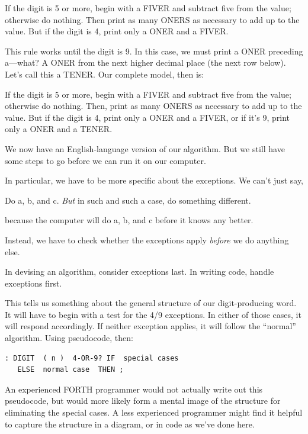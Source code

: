 \begin{tfquot}
If the digit is 5 or more, begin with a FIVER and subtract five from the
value; otherwise do nothing. Then print as many ONERS as necessary to
add up to the value. But if the digit is 4, print only a ONER and a FIVER.
\end{tfquot}
This rule works until the digit is 9. In this case, we must print a ONER
preceding a---what? A ONER from the next higher decimal place (the
next row below). Let's call this a TENER. Our complete model, then is:

\begin{tfquot}
If the digit is 5 or more, begin with a FIVER and subtract five from the
value; otherwise do nothing. Then, print as many ONERS as necessary to
add up to the value. But if the digit is 4, print only a ONER and a FIVER,
or if it's 9, print only a ONER and a TENER.
\end{tfquot}
We now have an English-language version of our algorithm. But we still
have some steps to go before we can run it on our computer.

In particular, we have to be more specific about the exceptions. We
can't just say,

\begin{tfquot}
Do a, b, and c. \emph{But} in such and such a case, do something different.
\end{tfquot}
because the computer will do a, b, and c before it knows any better.

Instead, we have to check whether the exceptions apply \emph{before} we
do anything else.

\begin{tip}
In devising an algorithm, consider exceptions last. In writing code, handle
exceptions first.
\end{tip}
This tells us something about the general structure of our digit-producing
word. It will have to begin with a test for the 4/9 exceptions. In
either of those cases, it will respond accordingly. If neither exception
applies, it will follow the ``normal'' algorithm. Using pseudocode, then:

\begin{verbatim}
: DIGIT  ( n )  4-OR-9? IF  special cases
   ELSE  normal case  THEN ;
\end{verbatim}

An experienced FORTH programmer would not actually write out this
pseudocode, but would more likely form a mental image of the structure
for eliminating the special cases. A less experienced programmer might
find it helpful to capture the structure in a diagram, or in code as we've
done here.

